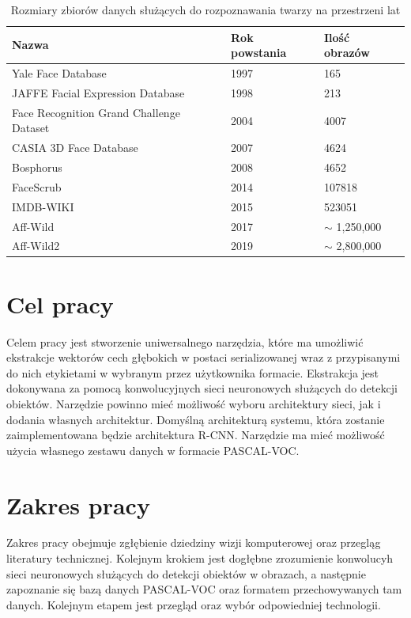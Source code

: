 \documentclass[a4paper,twoside,12pt]{book}
\begin{document}
\begin{table}
\centering

\begin{tabular}{|l|l|l|}
\hline
Nazwa & Rok powstania & Ilość obrazów \\
\hline
Yale Face Database & 1997 & 165 \\
JAFFE Facial Expression Database  & 1998 &  213 \\
Face Recognition Grand Challenge Dataset & 2004 & 4007 \\
CASIA 3D Face Database & 2007 & 4624 \\
Bosphorus &2008& 4652 \\
FaceScrub & 2014 & 107818 \\
IMDB-WIKI & 2015 & 523051 \\
Aff-Wild & 2017 & $\sim$ 1,250,000 \\
Aff-Wild2 & 2019 &$\sim$ 2,800,000 \\
\end{tabular}
\caption{Rozmiary zbiorów danych służących do rozpoznawania twarzy na przestrzeni lat}
\label{tab:datasets}
\end{table}  

\section{Cel pracy}
{Celem pracy jest stworzenie uniwersalnego narzędzia, które ma umożliwić ekstrakcje wektorów cech głębokich w postaci serializowanej wraz z przypisanymi do nich etykietami w wybranym przez użytkownika formacie. Ekstrakcja jest dokonywana za pomocą konwolucyjnych sieci neuronowych służących do detekcji obiektów. Narzędzie powinno mieć możliwość wyboru architektury sieci, jak i dodania własnych architektur. Domyślną architekturą systemu, która zostanie zaimplementowana będzie architektura R-CNN. Narzędzie ma mieć możliwość użycia własnego zestawu danych w formacie PASCAL-VOC.}
\section{Zakres pracy}
{Zakres pracy obejmuje zgłębienie dziedziny wizji komputerowej oraz przegląg literatury technicznej. Kolejnym krokiem jest dogłębne zrozumienie konwolucyh sieci neuronowych służących do detekcji obiektów w obrazach, a następnie zapoznanie się bazą danych PASCAL-VOC oraz formatem przechowywanych tam danych. Kolejnym etapem jest przegląd oraz wybór odpowiedniej technologii. }
\end{document}
